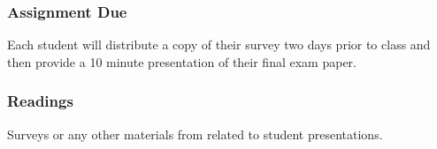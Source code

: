 \documentclass[12pt,a4paper]{article}
\begin{document}
\subsubsection*{Assignment Due}
Each student will distribute a copy of their survey two days prior to class and then provide a 10 minute presentation of their final exam paper.

\subsubsection*{Readings}
Surveys or any other materials from related to student presentations.




\end{document}
